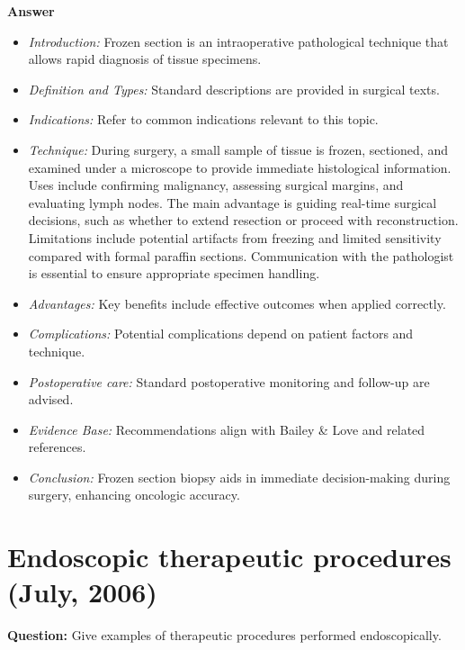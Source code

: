 \documentclass{article}
\begin{document}
\textbf{Answer}
\begin{itemize}

\item \emph{Introduction:} Frozen section is an intraoperative pathological technique that allows rapid diagnosis of tissue specimens.
\item \emph{Definition and Types:} Standard descriptions are provided in surgical texts.
\item \emph{Indications:} Refer to common indications relevant to this topic.

\item \emph{Technique:} During surgery, a small sample of tissue is frozen, sectioned, and examined under a microscope to provide immediate histological information. Uses include confirming malignancy, assessing surgical margins, and evaluating lymph nodes. The main advantage is guiding real-time surgical decisions, such as whether to extend resection or proceed with reconstruction. Limitations include potential artifacts from freezing and limited sensitivity compared with formal paraffin sections. Communication with the pathologist is essential to ensure appropriate specimen handling.
\item \emph{Advantages:} Key benefits include effective outcomes when applied correctly.
\item \emph{Complications:} Potential complications depend on patient factors and technique.
\item \emph{Postoperative care:} Standard postoperative monitoring and follow-up are advised.
\item \emph{Evidence Base:} Recommendations align with Bailey \& Love and related references.

\item \emph{Conclusion:} Frozen section biopsy aids in immediate decision-making during surgery, enhancing oncologic accuracy.


\end{itemize}

\section{Endoscopic therapeutic procedures (July, 2006)}

\textbf{Question:} Give examples of therapeutic procedures performed endoscopically.
\end{document}
